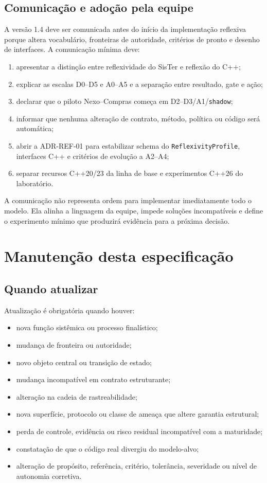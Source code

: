 \documentclass[11pt,a4paper,oneside]{article}
\begin{document}
\subsection{Comunicação e adoção pela equipe}
A versão 1.4 deve ser comunicada antes do início da implementação reflexiva porque altera vocabulário, fronteiras de autoridade, critérios de pronto e desenho de interfaces. A comunicação mínima deve:
\begin{enumerate}
  \item apresentar a distinção entre reflexividade do SisTer e reflexão do C++;
  \item explicar as escalas D0--D5 e A0--A5 e a separação entre resultado, gate e ação;
  \item declarar que o piloto Nexo--Compras começa em D2--D3/A1/\texttt{shadow};
  \item informar que nenhuma alteração de contrato, método, política ou código será automática;
  \item abrir a ADR-REF-01 para estabilizar schema do \texttt{ReflexivityProfile}, interfaces C++ e critérios de evolução a A2--A4;
  \item separar recursos C++20/23 da linha de base e experimentos C++26 do laboratório.
\end{enumerate}

A comunicação não representa ordem para implementar imediatamente todo o modelo. Ela alinha a linguagem da equipe, impede soluções incompatíveis e define o experimento mínimo que produzirá evidência para a próxima decisão.

\section{Manutenção desta especificação}

\subsection{Quando atualizar}
Atualização é obrigatória quando houver:
\begin{itemize}
  \item nova função sistêmica ou processo finalístico;
  \item mudança de fronteira ou autoridade;
  \item novo objeto central ou transição de estado;
  \item mudança incompatível em contrato estruturante;
  \item alteração na cadeia de rastreabilidade;
  \item nova superfície, protocolo ou classe de ameaça que altere garantia estrutural;
  \item perda de controle, evidência ou risco residual incompatível com a maturidade;
  \item constatação de que o código real divergiu do modelo-alvo;
  \item alteração de propósito, referência, critério, tolerância, severidade ou nível de autonomia corretiva.
\end{itemize}
\end{document}
